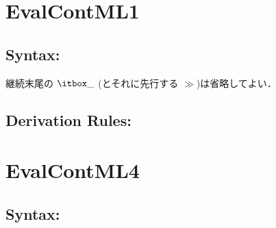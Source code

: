 \documentclass[11pt]{jarticle}
\begin{document}
\PolyTypingMLivDisplayRules

\newpage

\section*{EvalContML1}



\subsection*{Syntax:}

\EvalContMLiDisplayBNF

継続末尾の \(\Hole\) (とそれに先行する \(\gg\))は省略してよい．

\subsection*{Derivation Rules:}
\EvalContMLiDisplayRules

\newpage

\section*{EvalContML4}



\subsection*{Syntax:}
\end{document}
